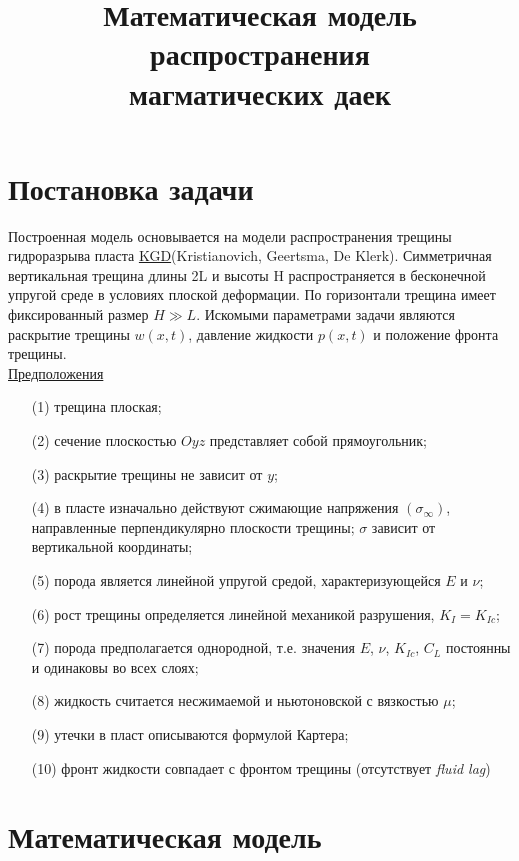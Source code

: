 \documentclass[11pt,a4paper,russian,dvipsnames ]{article}
\begin{document}
\title{Математическая модель распространения \\ магматических даек}
\date{\vspace{-9ex}}
\maketitle

\section{Постановка задачи}
Построенная модель основывается на модели распространения трещины гидроразрыва пласта \underline{KGD}(Kristianovich, Geertsma, De Klerk).
Симметричная вертикальная трещина длины 2L и высоты H распространяется в бесконечной упругой среде в условиях плоской деформации.
По горизонтали трещина имеет фиксированный размер $H\gg L$. 
Искомыми параметрами задачи являются раскрытие трещины $w(x,t)$, давление жидкости $p(x,t)$ и положение фронта трещины.
\\

\underline{Предположения}
\begin{itemize}\setlength\itemsep{0.1em}
	\item[(1)] трещина плоская;
	\item[(2)] сечение плоскостью $Oyz$ представляет собой прямоугольник;
	\item[(3)] раскрытие трещины не зависит от $y$;
	\item[(4)] в пласте изначально действуют сжимающие напряжения $(\sigma_{\infty})$, направленные перпендикулярно плоскости трещины; $\sigma$ зависит от вертикальной координаты; %
	\item[(5)] порода является линейной упругой средой, характеризующейся $E$ и $\nu$;
	\item[(6)] рост трещины определяется линейной механикой разрушения, $K_I = K_{Ic}$;
	\item[(7)] порода предполагается однородной, т.е. значения $E$, $\nu$, $K_{Ic}$, $C_L$ постоянны и одинаковы во всех слоях;
	\item[(8)] жидкость считается несжимаемой и ньютоновской с вязкостью $\mu$;
	\item[(9)] утечки в пласт описываются формулой Картера;
	\item[(10)] фронт жидкости совпадает с фронтом трещины (отсутствует \emph{fluid lag})
\end{itemize}

\section{Математическая модель}
\end{document}
